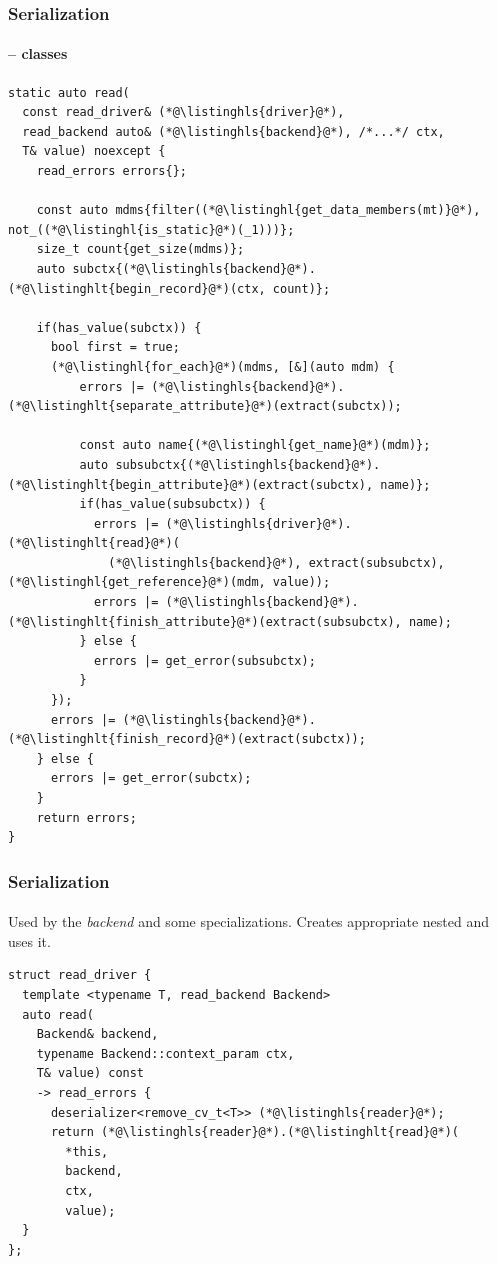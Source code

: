 \documentclass[compress,table,xcolor=table]{beamer}
\begin{document}
\begin{frame}[fragile]
  \frametitle{Serialization}
  \framesubtitle{ -- classes}
  \begin{lstlisting}[language=c++2x,basicstyle=\tiny\ttfamily]
static auto read(
  const read_driver& (*@\listinghls{driver}@*),
  read_backend auto& (*@\listinghls{backend}@*), /*...*/ ctx,
  T& value) noexcept {
    read_errors errors{};

    const auto mdms{filter((*@\listinghl{get_data_members(mt)}@*), not_((*@\listinghl{is_static}@*)(_1)))};
    size_t count{get_size(mdms)};
    auto subctx{(*@\listinghls{backend}@*).(*@\listinghlt{begin_record}@*)(ctx, count)};

    if(has_value(subctx)) {
      bool first = true;
      (*@\listinghl{for_each}@*)(mdms, [&](auto mdm) {
          errors |= (*@\listinghls{backend}@*).(*@\listinghlt{separate_attribute}@*)(extract(subctx));

          const auto name{(*@\listinghl{get_name}@*)(mdm)};
          auto subsubctx{(*@\listinghls{backend}@*).(*@\listinghlt{begin_attribute}@*)(extract(subctx), name)};
          if(has_value(subsubctx)) {
            errors |= (*@\listinghls{driver}@*).(*@\listinghlt{read}@*)(
              (*@\listinghls{backend}@*), extract(subsubctx), (*@\listinghl{get_reference}@*)(mdm, value));
            errors |= (*@\listinghls{backend}@*).(*@\listinghlt{finish_attribute}@*)(extract(subsubctx), name);
          } else {
            errors |= get_error(subsubctx);
          }
      });
      errors |= (*@\listinghls{backend}@*).(*@\listinghlt{finish_record}@*)(extract(subctx));
    } else {
      errors |= get_error(subctx);
    }
    return errors;
}
  \end{lstlisting}
\end{frame}
\begin{frame}[fragile]
  \frametitle{Serialization}
  \framesubtitle{}
  Used by the {\em backend} and some  specializations.
  Creates appropriate nested  and uses it.
  \begin{lstlisting}[language=c++2x,basicstyle=\small\ttfamily]
struct read_driver {
  template <typename T, read_backend Backend>
  auto read(
    Backend& backend,
    typename Backend::context_param ctx,
    T& value) const
    -> read_errors {
      deserializer<remove_cv_t<T>> (*@\listinghls{reader}@*);
      return (*@\listinghls{reader}@*).(*@\listinghlt{read}@*)(
        *this,
        backend,
        ctx,
        value);
  }
};
  \end{lstlisting}
\end{frame}
\end{document}

